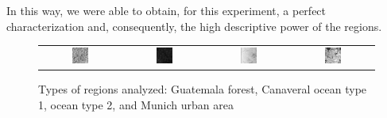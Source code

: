 \documentclass[journal]{IEEEtran}
\begin{document}
In this way, we were able to obtain, for this experiment, a perfect characterization and, consequently, the high descriptive power of the regions.

\begin{figure}[hbt]
	\begin{tabular}{cccc}
		\includegraphics[width=0.22\textwidth]{Figures/guatemalaflorest.pdf} &   \includegraphics[width=0.22\textwidth]{Figures/Cape1.pdf} &
		\includegraphics[width=0.22\textwidth]{Figures/Cape2.pdf} &  \includegraphics[width=0.22\textwidth]{Figures/munichUrban.pdf} \\
	\end{tabular}
	\caption{Types of regions analyzed: Guatemala forest, Canaveral ocean type 1,
		ocean type 2, and Munich urban area}
	\label{fig:samples}
\end{figure}
\end{document}
